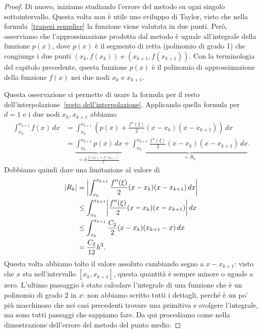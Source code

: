 \documentclass[a4paper]{report}
\DeclarePairedDelimiter{\abs}{\lvert}{\rvert}
\theoremstyle{definiton}
\theoremstyle{remark}
\begin{document}
\begin{proof}
    Di nuovo, iniziamo studiando l'errore del metodo su ogni singolo sottointervallo. Questa volta non è utile uno sviluppo di Taylor, visto che nella formula~\eqref{trapezi semplice} la funzione viene valutata in due punti. Però, osserviamo che l'approssimazione prodotta dal metodo è uguale all'integrale della funzione $p(x)$, dove $p(x)$ è il segmento di retta (polinomio di grado 1) che congiunge i due punti $(x_k, f(x_k))$ e $(x_{k+1},f(x_{k+1}))$. Con la terminologia del capitolo precedente, questa funzione $p(x)$ è il polinomio di approssimazione della funzione $f(x)$ nei due nodi $x_k$ e $x_{k+1}$. 
    
    Questa osservazione ci permette di usare la formula per il resto dell'interpolazione~\eqref{resto dell'interpolazione}. Applicando quella formula per $d=1$ e i due nodi $x_k,x_{k+1}$ abbiamo
    \begin{align*}
    \int_{x_k}^{x_{k+1}} f(x)\, dx &= \int_{x_k}^{x_{k+1}} \left(p(x) + \frac{f''(\xi)}{2}(x-x_k)(x-x_{k+1}) \right)\, dx\\
    &= \underbrace{\int_{x_k}^{x_{k+1}} p(x)\, dx}_{=h\frac{f(x_k)+f(x_{k+1})}{2}} +
    \underbrace{\int_{x_k}^{x_{k+1}} \frac{f''(\xi)}{2}(x-x_k)(x-x_{k+1}) \, dx}_{=R_k}.
    \end{align*}
    Dobbiamo quindi dare una limitazione al valore di
    \begin{align*}
        \abs{R_k} &= \abs*{\int_{x_k}^{x_{k+1}} \frac{f''(\xi)}{2}(x-x_k)(x-x_{k+1}) \, dx}\\
        & \leq \int_{x_k}^{x_{k+1}} \abs*{\frac{f''(\xi)}{2}(x-x_k)(x-x_{k+1})}\, dx\\
        & \leq \int_{x_k}^{x_{k+1}} \frac{C_2}{2} (x-x_k)(x_{k+1}-x)\, dx\\
        & = \frac{C_2}{12}h^3.
    \end{align*}
    Questa volta abbiamo tolto il valore assoluto cambiando segno a $x - x_{k+1}$: visto che $x$ sta nell'intervallo $[x_k,x_{k+1}]$, questa quantità è sempre minore o uguale a zero. L'ultimo passaggio è stato calcolare l'integrale di una funzione che è un polinomio di grado 2 in $x$: non abbiamo scritto tutti i dettagli, perché è un po' più macchinoso che nei casi precedenti trovare una primitiva e svolgere l'integrale, ma sono tutti passaggi che sappiamo fare. Da qui procediamo come nella dimostrazione dell'errore del metodo del punto medio.
\end{proof}
\end{document}
